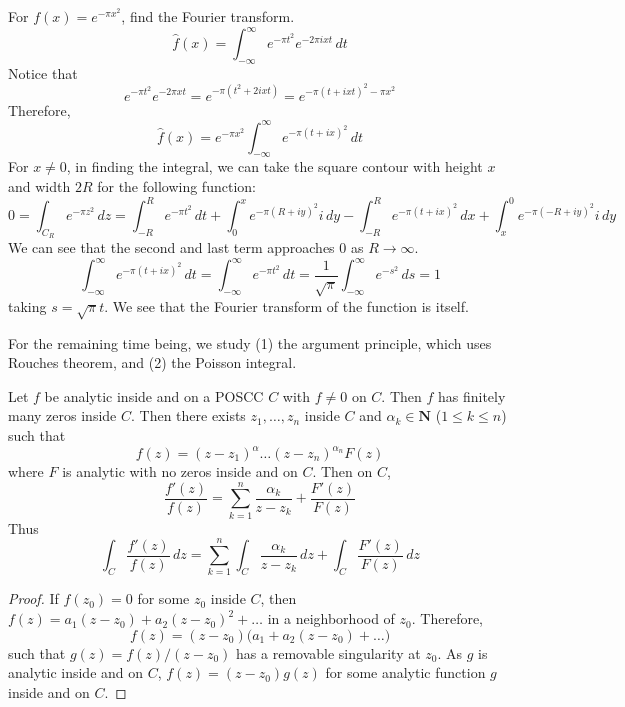 \vspace{2ex}
\begin{ex}
For $f(x)=e^{-\pi x^2}$, find the Fourier transform.
\[\widehat{f}(x)=\int ^{\infty }_{-\infty }e^{-\pi t^2}e^{-2\pi ixt}\,dt\]
Notice that
\[e^{-\pi t^2}e^{-2\pi xt}=e^{-\pi (t^2+2ixt)}=e^{-\pi (t+ixt)^2-\pi x^2}\]
Therefore,
\[\widehat{f}(x)=e^{-\pi x^2}\int ^{\infty }_{-\infty }e^{-\pi (t+ix)^2}\,dt\]
For $x\ne0$, in finding the integral, we can take the square contour with height $x$ and width $2R$ for the following function:
\[0=\int _{C_{R}}e^{-\pi z^2}\,dz=\int ^{R}_{-R}e^{-\pi t^2}\,dt+\int ^{x}_{0}e^{-\pi (R+iy)^2}i\,dy-\int ^{R}_{-R}e^{-\pi (t+ix)^2}\,dx+\int ^{0}_{x}e^{-\pi (-R+iy)^2}i\,dy\]
We can see that the second and last term approaches $0$ as $R\rightarrow \infty $.
\[\int ^{\infty }_{-\infty }e^{-\pi (t+ix)^2}\,dt=\int ^{\infty }_{-\infty }e^{-\pi t^2}\,dt=\dfrac{1}{\sqrt{\pi }}\int ^{\infty }_{-\infty }e^{-s^2}\,ds=1\]
taking $s=\sqrt{\pi }t$. We see that the Fourier transform of the function is itself.
\end{ex}
\vspace{2ex}
\begin{rmk}
For the remaining time being, we study (1) the argument principle, which uses Rouches theorem, and (2) the Poisson integral.
\end{rmk}
\vspace{2ex}
\begin{thm}
Let $f$ be analytic inside and on a POSCC $C$ with $f\ne 0$ on $C$. Then $f$ has finitely many zeros inside $C$. Then there exists $z_1,\ldots ,z_{n}$ inside $C$ and $\alpha _{k}\in {\bm N}$ ($1\leq k\leq n$) such that
\[f(z)=(z-z_1)^{\alpha }\ldots (z-z_{n})^{\alpha _{n}}F(z)\]
where $F$ is analytic with no zeros inside and on $C$. Then on $C$,
\[\dfrac{f'(z)}{f(z)}=\sum ^{n}_{k=1}\dfrac{\alpha _{k}}{z-z_{k}}+\dfrac{F'(z)}{F(z)}\]
Thus
\[\int _{C}\dfrac{f'(z)}{f(z)}\,dz=\sum _{k=1}^{n}\int _{C}\dfrac{\alpha _{k}}{z-z_{k}}\,dz+\int _{C}\dfrac{F'(z)}{F(z)}\,dz\]
\end{thm}
\vspace{2ex}
\begin{proof}
If $f(z_0)=0$ for some $z_0$ inside $C$, then $f(z)=a_1(z-z_0)+a_2(z-z_0)^2+\ldots $ in a neighborhood of $z_0$. Therefore,
\[f(z)=(z-z_0)\Big(a_1+a_2(z-z_0)+\ldots \Big)\]
such that $g(z)=f(z)/(z-z_0)$ has a removable singularity at $z_0$. As $g$ is analytic inside and on $C$, $f(z)=(z-z_0)g(z)$ for some analytic function $g$ inside and on $C$.
\end{proof}
\vspace{2ex}
